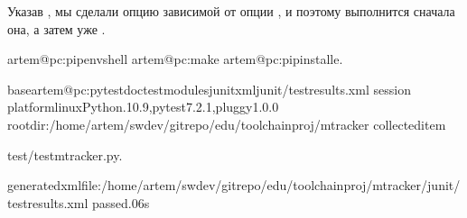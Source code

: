 \documentclass[letterpaper,10pt,russian]{sphinxmanual}
\begin{document}
\sphinxAtStartPar
Указав , мы сделали опцию  зависимой от опции , и поэтому выполнится сначала она, а затем уже .

\begin{sphinxVerbatim}[commandchars=\\\{\}]
artem@pc:\PYGZti{}\PYGZdl{}pipenvshell
artem@pc:\PYGZti{}\PYGZdl{}make
artem@pc:\PYGZti{}\PYGZdl{}pipinstall\PYGZhy{}e.


baseartem@pc:\PYGZti{}\PYGZdl{}pytest\PYGZhy{}\PYGZhy{}doctest\PYGZhy{}modules\PYGZhy{}\PYGZhy{}junitxmljunit/test\PYGZhy{}results.xml
session
platformlinux\PYGZhy{}\PYGZhy{}Python.10.9,pytest\PYGZhy{}7.2.1,pluggy\PYGZhy{}1.0.0
rootdir:/home/artem/swdev/gitrepo/edu/toolchain\PYGZus{}proj/mtracker
collecteditem

test/test\PYGZus{}mtracker.py.\PYG{o}{[}\PYGZpc{}\PYG{o}{]}

\PYGZhy{}generatedxmlfile:/home/artem/swdev/gitrepo/edu/toolchain\PYGZus{}proj/mtracker/junit/test\PYGZhy{}results.xml\PYGZhy{}
passed.06s
\end{sphinxVerbatim}
\end{document}
